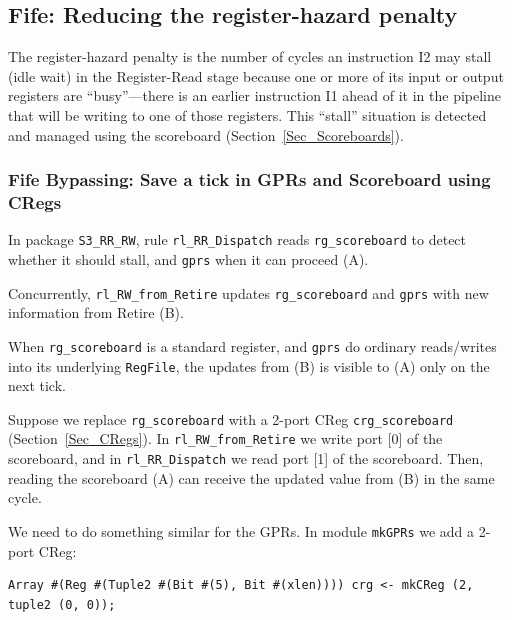 
\subsection{Fife: Reducing the register-hazard penalty}

\label{Sec_Reducing_Hazards}

The register-hazard penalty is the number of cycles an instruction I2
may stall (idle wait) in the Register-Read stage because one or more
of its input or output registers are ``busy''---there is an earlier
instruction I1 ahead of it in the pipeline that will be writing to one
of those registers.  This ``stall'' situation is detected and managed
using the scoreboard (Section~\ref{Sec_Scoreboards}).


\subsubsection{Fife Bypassing: Save a tick in GPRs and Scoreboard using CRegs}

In package \verb|S3_RR_RW|, rule \verb|rl_RR_Dispatch| reads
\verb|rg_scoreboard| to detect whether it should stall, and
\verb|gprs| when it can proceed (A).

Concurrently, \verb|rl_RW_from_Retire| updates \verb|rg_scoreboard|
and \verb|gprs| with new information from Retire (B).

When \verb|rg_scoreboard| is a standard register, and \verb|gprs| do
ordinary reads/writes into its underlying \verb|RegFile|, the updates
from (B) is visible to (A) only on the next tick.

Suppose we replace \verb|rg_scoreboard| with a 2-port CReg
\verb|crg_scoreboard| (Section~\ref{Sec_CRegs}). In
\verb|rl_RW_from_Retire| we write port [0] of the scoreboard, and in
\verb|rl_RR_Dispatch| we read port [1] of the scoreboard.  Then,
reading the scoreboard (A) can receive the updated value from (B) in
the same cycle.

We need to do something similar for the GPRs.  In module \verb|mkGPRs|
we add a 2-port CReg:

{\footnotesize
\begin{Verbatim}[frame=single, label=src\_Common/GPRs.bsv]
 Array #(Reg #(Tuple2 #(Bit #(5), Bit #(xlen)))) crg <- mkCReg (2, tuple2 (0, 0));
\end{Verbatim}
}

